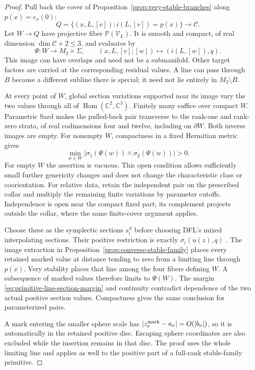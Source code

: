 \documentclass[11pt]{amsart}
\theoremstyle{definition}
\theoremstyle{remark}
\theoremstyle{plain}
\newcommand{\CC}{\mathbb{C}}
\newcommand{\PP}{\mathbb{P}}
\newcommand{\cC}{\mathcal{C}}
\begin{document}
\begin{proof}
Pull back the cover of Proposition~\ref{prop:very-stable-branches}
along $p(x)=e_x(0)$:
\[
 Q=\{(x,L,[v]):i(L,[v])=p(x)\}\longrightarrow\cC .
\]
Let $W\to Q$ have projective fiber $\PP(\mathcal V_L)$.
It is smooth and compact, of real dimension
$\dim\cC+2\leq3$, and evaluates by
\begin{equation}\label{eq:primitive-line-evaluation-family}
 \Psi:W\longrightarrow M_2\times\Sigma,\qquad
 (x,L,[v];[w])\longmapsto(i(L,[w]),q).
\end{equation}
This image can have overlaps and need not be a submanifold.
Other target factors are carried at the corresponding
residual values. A line can pass through $B$ because a
different subline there is special; it need not lie
entirely in $M_2\setminus B$.

At every point of $W$, global section variations supported
near its image vary the two values through all of
$\operatorname{Hom}(\CC^2,\CC^3)$. Finitely many suffice over
compact $W$. Parametric Sard makes the pulled-back pair
transverse to the rank-one and rank-zero strata, of real
codimensions four and twelve, including on $\partial W$.
Both inverse images are empty. For nonempty $W$, compactness
in a fixed Hermitian metric gives
\begin{equation}\label{eq:primitive-line-section-margin}
       \min_{w\in W}
       |\sigma_1(\Psi(w))\wedge\sigma_2(\Psi(w))|>0.
\end{equation}
For empty $W$ the assertion is vacuous. This open condition
allows sufficiently small further genericity changes and
does not change the characteristic class or coorientation.
For relative data, retain the independent pair on the
prescribed collar and multiply the remaining finite
variations by parameter cutoffs. Independence is open near
the compact fixed part; its complement projects outside
the collar, where the same finite-cover argument applies.

Choose these as the symplectic sections $s_i^S$ before
choosing DFL's mixed interpolating sections. Their positive
restriction is exactly $\sigma_i(u(z),q)$
\cite[Section~7.2, equation~(7.9)]{DaeFukLip21a}.
The image extraction in
Proposition~\ref{prop:converse-stable-family} places every
retained marked value at distance tending to zero from a
limiting line through $p(x)$. Very stability places that
line among the four fibers defining $W$.
A subsequence of marked values therefore limits to $\Psi(W)$.
The margin \eqref{eq:primitive-line-section-margin} and
continuity contradict dependence of the two actual positive
section values. Compactness gives the same conclusion
for parameterized pairs.

A mark entering the smaller sphere scale has
$|z_\nu^{\rm mark}-a_\nu|=O(|b_\nu|)$, so it is
automatically in the retained positive disc.
Escaping sphere coordinates are also excluded while the
insertion remains in that disc. The proof uses the whole
limiting line and applies as well to the positive part
of a full-rank stable-family primitive.
\end{proof}
\end{document}
